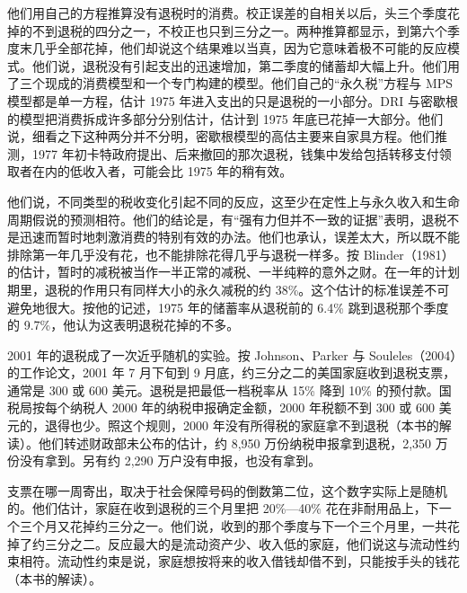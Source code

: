 他们用自己的方程推算没有退税时的消费\cite{ms1977}。校正误差的自相关以后，头三个季度花掉的不到退税的四分之一，不校正也只到三分之一\cite{ms1977}。两种推算都显示，到第六个季度末几乎全部花掉，他们却说这个结果难以当真，因为它意味着极不可能的反应模式\cite{ms1977}。他们说，退税没有引起支出的迅速增加，第二季度的储蓄却大幅上升\cite{ms1977}。他们用了三个现成的消费模型和一个专门构建的模型\cite{ms1977}。他们自己的“永久税”方程与 MPS 模型都是单一方程，估计 1975 年进入支出的只是退税的一小部分\cite{ms1977}。DRI 与密歇根的模型把消费拆成许多部分分别估计，估计到 1975 年底已花掉一大部分\cite{ms1977}。他们说，细看之下这种两分并不分明，密歇根模型的高估主要来自家具方程\cite{ms1977}。他们推测，1977 年初卡特政府提出、后来撤回的那次退税，钱集中发给包括转移支付领取者在内的低收入者，可能会比 1975 年的稍有效\cite{ms1977}。

他们说，不同类型的税收变化引起不同的反应，这至少在定性上与永久收入和生命周期假说的预测相符\cite{ms1977}。他们的结论是，有“强有力但并不一致的证据”表明，退税不是迅速而暂时地刺激消费的特别有效的办法\cite{ms1977}。他们也承认，误差太大，所以既不能排除第一年几乎没有花，也不能排除花得几乎与退税一样多\cite{ms1977}。按 Blinder（1981）的估计，暂时的减税被当作一半正常的减税、一半纯粹的意外之财\cite{blinder1981}。在一年的计划期里，退税的作用只有同样大小的永久减税的约 38\%\cite{blinder1981}。这个估计的标准误差不可避免地很大\cite{blinder1981}。按他的记述，1975 年的储蓄率从退税前的 6.4\% 跳到退税那个季度的 9.7\%，他认为这表明退税花掉的不多\cite{blinder1981}。

2001 年的退税成了一次近乎随机的实验。按 Johnson、Parker 与 Souleles（2004）的工作论文，2001 年 7 月下旬到 9 月底，约三分之二的美国家庭收到退税支票，通常是 300 或 600 美元\cite{jps2004}。退税是把最低一档税率从 15\% 降到 10\% 的预付款\cite{jps2004}。国税局按每个纳税人 2000 年的纳税申报确定金额，2000 年税额不到 300 或 600 美元的，退得也少\cite{jps2004}。照这个规则，2000 年没有所得税的家庭拿不到退税（本书的解读）。他们转述财政部未公布的估计，约 8,950 万份纳税申报拿到退税，2,350 万份没有拿到\cite{jps2004}。另有约 2,290 万户没有申报，也没有拿到\cite{jps2004}。

支票在哪一周寄出，取决于社会保障号码的倒数第二位，这个数字实际上是随机的\cite{jps2004}。他们估计，家庭在收到退税的三个月里把 20\%—40\% 花在非耐用品上，下一个三个月又花掉约三分之一\cite{jps2004}。他们说，收到的那个季度与下一个三个月里，一共花掉了约三分之二\cite{jps2004}。反应最大的是流动资产少、收入低的家庭，他们说这与流动性约束相符\cite{jps2004}。流动性约束是说，家庭想按将来的收入借钱却借不到，只能按手头的钱花（本书的解读）。

